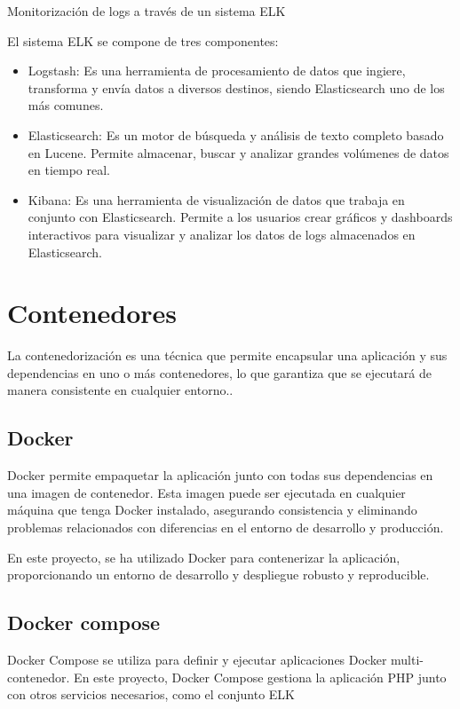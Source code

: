 Monitorización de logs a través de un sistema ELK

El sistema ELK se compone de tres componentes:

\begin{itemize}
    \item
    Logstash: Es una herramienta de procesamiento de datos que ingiere, transforma y envía datos a diversos destinos,
    siendo Elasticsearch uno de los más comunes.
    \item
    Elasticsearch: Es un motor de búsqueda y análisis de texto completo basado en Lucene. Permite almacenar, buscar y
    analizar grandes volúmenes de datos en tiempo real.
    \item Kibana: Es una herramienta de visualización de datos que trabaja en conjunto con Elasticsearch. Permite a los
    usuarios crear gráficos y dashboards interactivos para visualizar y analizar los datos de logs almacenados en
    Elasticsearch.
\end{itemize}

\section*{Contenedores}
La contenedorización es una técnica que permite encapsular una aplicación y sus dependencias en uno o más contenedores,
lo que garantiza que se ejecutará de manera consistente en cualquier entorno..

\subsection*{Docker}
Docker permite empaquetar la aplicación junto con todas sus dependencias en una imagen de contenedor. Esta imagen puede
ser ejecutada en cualquier máquina que tenga Docker instalado, asegurando consistencia y eliminando problemas
relacionados con diferencias en el entorno de desarrollo y producción.

En este proyecto, se ha utilizado Docker para contenerizar la aplicación, proporcionando un entorno de desarrollo y
despliegue robusto y reproducible.

\subsection*{Docker compose}
Docker Compose se utiliza para definir y ejecutar aplicaciones Docker multi-contenedor. En este proyecto, Docker Compose
gestiona la aplicación PHP junto con otros servicios necesarios, como el conjunto ELK
